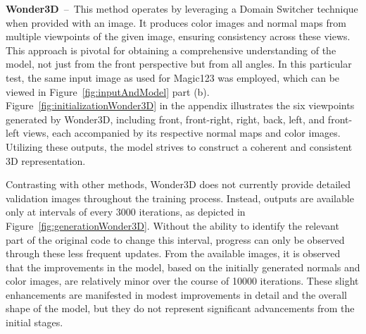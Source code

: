 \textbf{Wonder3D}~--~This method operates by leveraging a Domain Switcher technique when provided with an image. It produces color images and normal maps from multiple viewpoints of the given image, ensuring consistency across these views. This approach is pivotal for obtaining a comprehensive understanding of the model, not just from the front perspective but from all angles. In this particular test, the same input image as used for Magic123 was employed, which can be viewed in Figure~\ref{fig:inputAndModel} part (b). Figure~\ref{fig:initializationWonder3D} in the appendix illustrates the six viewpoints generated by Wonder3D, including front, front-right, right, back, left, and front-left views, each accompanied by its respective normal maps and color images. Utilizing these outputs, the model strives to construct a coherent and consistent 3D representation.

Contrasting with other methods, Wonder3D does not currently provide detailed validation images throughout the training process. Instead, outputs are available only at intervals of every 3000 iterations, as depicted in Figure~\ref{fig:generationWonder3D}. Without the ability to identify the relevant part of the original code to change this interval, progress can only be observed through these less frequent updates. From the available images, it is observed that the improvements in the model, based on the initially generated normals and color images, are relatively minor over the course of 10000 iterations. These slight enhancements are manifested in modest improvements in detail and the overall shape of the model, but they do not represent significant advancements from the initial stages.

